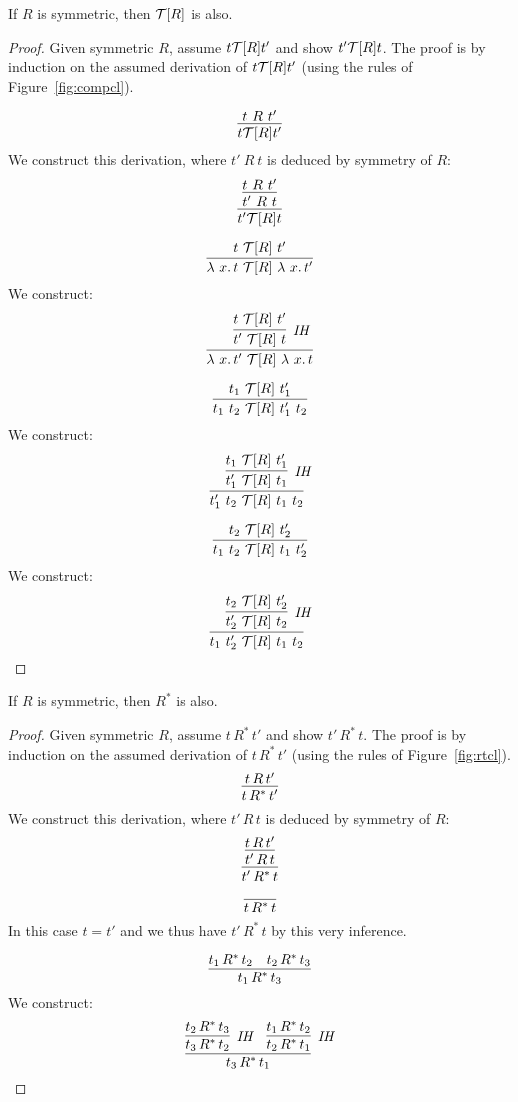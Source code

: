 \begin{lemma}
\label{lem:compclsymm}
  If $R$ is symmetric, then $\mathcal{T}[R]$ is also.
\end{lemma}
\begin{proof}
  Given symmetric $R$, assume $t \mathcal{T}[R] t'$ and show $t' \mathcal{T}[R] t$.
  The proof is by induction on the assumed derivation of $t \mathcal{T}[R] t'$ (using the rules of Figure~\ref{fig:compcl}).

  \case{ }
  \[
  \infer{t \Tau[R] t'}{t\ R\ t' }
  \]
  \noindent We construct this derivation, where $t'\ R\ t$ is deduced by symmetry of $R$:
  \[
  \infer{t' \Tau[R] t}{\infer{t'\ R\ t}{t\ R\ t'}}
  \]

  \case{ }
  \[
  \infer{\lam{x}{t}\ \Tau[R]\ \lam{x}{t'}}{t\ \Tau[R]\ t'}
  \]
  \noindent We construct:
  \[
  \infer{\lam{x}{t'}\ \Tau[R]\ \lam{x}{t}}{\infer[\textit{IH}]{t'\ \Tau[R]\ t}{t\ \Tau[R]\ t'}}
  \]

  \case{ }
  \[
  \infer{t_1\ t_2\ \Tau[R]\ t_1'\ t_2}{t_1\ \Tau[R]\ t_1'}
  \]
  \noindent We construct:
  \[
  \infer{t_1'\ t_2\ \Tau[R]\ t_1\ t_2}{\infer[\textit{IH}]{t_1'\ \Tau[R]\ t_1}{t_1\ \Tau[R]\ t_1'}}
  \]

  \case{ }
  \[
  \infer{t_1\ t_2\ \Tau[R]\ t_1\ t_2'}{t_2\ \Tau[R]\ t_2'}
  \]
  \noindent We construct:
  \[
  \infer{t_1\ t_2'\ \Tau[R]\ t_1\ t_2}{\infer[\textit{IH}]{t_2'\ \Tau[R]\ t_2}{t_2\ \Tau[R]\ t_2'}}
  \]
  
  \end{proof}

\begin{lemma}
\label{lem:rtclsymm}
  If $R$ is symmetric, then $R^*$ is also.
\end{lemma}
\begin{proof}
  Given symmetric $R$, assume $t\,R^*\,t'$ and show $t'\,R^*\,t$.  The proof is by induction
  on the assumed derivation of $t\,R^*\,t'$ (using the rules of Figure~\ref{fig:rtcl}).
  \case{ }
  \[
  \infer{t\,R^*\,t'}{t\,R\,t'}
  \]
  \noindent We construct this derivation, where $t'\,R\,t$ is deduced by symmetry of $R$:
  \[
  \infer{t'\,R^*\,t}{\infer{t'\,R\,t}{t\,R\,t'}}
  \]

  \case{ }
  \[
  \infer{t\,R^*\,t}{\,}
  \]
  \noindent In this case $t = t'$ and we thus have $t'\,R^*\,t$ by this very inference.

  \case{ }
  \[
  \infer{t_1\,R^*\,t_3}{t_1\,R^*\,t_2 & t_2\,R^*\,t_3}
  \]
  \noindent We construct:
  \[
  \infer{t_3\,R^*\,t_1}{\infer[\textit{IH}]{t_3\,R^*\,t_2}{t_2\,R^*\,t_3} & \infer[\textit{IH}]{t_2\,R^*\,t_1}{t_1\,R^*\,t_2}}
  \]
  \end{proof}

